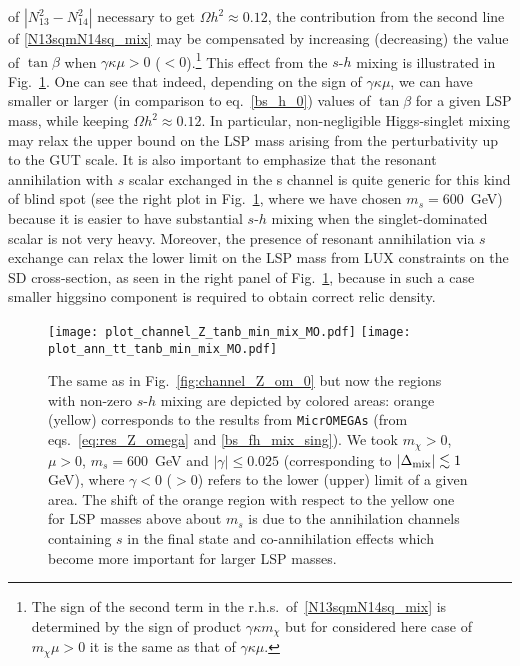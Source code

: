 \documentclass[12pt,twoside]{article}
\begin{document}
of $\left|N_{13}^2-N_{14}^2\right|$ necessary to get $\Omega h^2\approx0.12$, 
the contribution from the second line of \eqref{N13sqmN14sq_mix} may be 
compensated by increasing (decreasing) the value of $\tan\beta$ 
when $\gamma\kappa\mu>0$ ($<0$).\footnote{\label{foot_signs}
The sign of the second term in the r.h.s.~of~\eqref{N13sqmN14sq_mix} 
is determined by the sign of product $\gamma\kappa m_\chi$ 
but for considered here case of $m_\chi\mu>0$ it is the same as that 
of $\gamma\kappa\mu$.}
This effect from the $s$-$h$ mixing is illustrated in 
Fig.~\ref{fig:channel_Z_om_mix}. One can see that indeed, depending on the 
sign of $\gamma\kappa\mu$, we can have smaller or larger (in comparison to 
eq.~\eqref{bs_h_0}) values of $\tan\beta$ for a given LSP mass, while keeping 
$\Omega h^2\approx 0.12$. In particular, non-negligible Higgs-singlet mixing may relax the upper bound on the LSP mass arising from the
perturbativity up to the GUT scale.
It is also important to emphasize that the resonant annihilation
with $s$ scalar exchanged in the s channel is quite generic for this kind 
of blind spot (see the right plot in Fig.~\ref{fig:channel_Z_om_mix}, 
where we have chosen $m_s=600$~GeV) because it is easier to have substantial 
 $s$-$h$ mixing when the singlet-dominated scalar is not very heavy. Moreover, the presence of resonant annihilation via $s$ exchange can relax the
lower limit on the LSP mass from LUX constraints on the SD cross-section, as seen in the right panel of Fig.~\ref{fig:channel_Z_om_mix}, because in
such a case smaller higgsino component is required to obtain correct relic density.


\begin{figure}[t]
\center
\texttt{[image: plot\_channel\_Z\_tanb\_min\_mix\_MO.pdf]}
\texttt{[image: plot\_ann\_tt\_tanb\_min\_mix\_MO.pdf]}
\caption{The same as in Fig.~\ref{fig:channel_Z_om_0} but now the regions 
with non-zero $s$-$h$ mixing are depicted by colored areas: orange (yellow) 
corresponds to the results from \texttt{MicrOMEGAs} 
(from eqs.~\eqref{eq:res_Z_omega} and \eqref{bs_fh_mix_sing}). We took $m_{\chi}>0$, $\mu>0$, $m_s=600$~GeV and $|\gamma|\leq 0.025$ (corresponding to
 $|\Delta_{\rm mix}|\lesssim 1$ GeV), where $\gamma<0$ ($>0$) refers to the lower (upper) limit of a given area.  
The shift of the orange region with respect to the yellow one for LSP 
masses above about $m_s$ is due to the annihilation channels containing 
$s$ in the final state and co-annihilation effects which become more important for larger LSP masses.
}
\label{fig:channel_Z_om_mix}
\end{figure}
\end{document}
